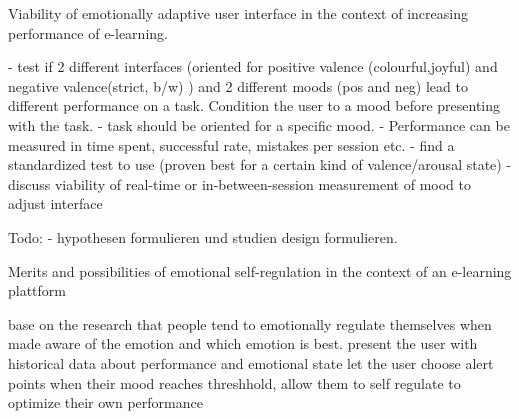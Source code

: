 Viability of emotionally adaptive user interface in the context of increasing performance of e-learning.

- test if 2 different interfaces (oriented for positive valence (colourful,joyful) and negative valence(strict, b/w) ) and 2 different moods (pos and neg) lead to different performance on a task. Condition the user to a mood before presenting with the task.
- task should be oriented for a specific mood. 
- Performance can be measured in time spent, successful rate, mistakes per session etc.
- find a standardized test to use (proven best for a certain kind of valence/arousal state)
- discuss viability of real-time or in-between-session measurement of mood to adjust interface




Todo: 
- hypothesen formulieren und studien design formulieren.





Merits and possibilities of emotional self-regulation in the context of an e-learning plattform

base on the research that people tend to emotionally regulate themselves when made aware of the emotion and which emotion is best.
present the user with historical data about performance and emotional state
let the user choose alert points when their mood reaches threshhold, allow them to self regulate to optimize their own performance